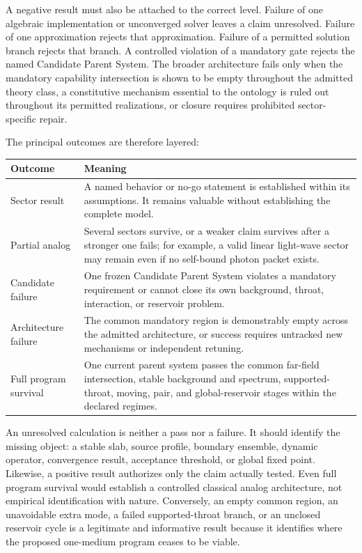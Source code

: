 A negative result must also be attached to the correct level. Failure of one
algebraic implementation or unconverged solver leaves a claim unresolved. Failure
of one approximation rejects that approximation. Failure of a permitted
solution branch rejects that branch. A controlled violation of a mandatory gate
rejects the named Candidate Parent System. The broader architecture fails only
when the mandatory capability intersection is shown to be empty throughout the
admitted theory class, a constitutive mechanism essential to the ontology is
ruled out throughout its permitted realizations, or closure requires prohibited
sector-specific repair.

The principal outcomes are therefore layered:

\begin{center}
\begin{tabularx}{\textwidth}{@{}L{0.27\textwidth}X@{}}
\toprule
\textbf{Outcome} & \textbf{Meaning} \\
\midrule
Sector result
& A named behavior or no-go statement is established within its assumptions. It
  remains valuable without establishing the complete model. \\
Partial analog
& Several sectors survive, or a weaker claim survives after a stronger one
  fails; for example, a valid linear light-wave sector may remain even if no
  self-bound photon packet exists. \\
Candidate failure
& One frozen Candidate Parent System violates a mandatory requirement or cannot
  close its own background, throat, interaction, or reservoir problem. \\
Architecture failure
& The common mandatory region is demonstrably empty across the admitted
  architecture, or success requires untracked new mechanisms or independent
  retuning. \\
Full program survival
& One current parent system passes the common far-field intersection, stable
  background and spectrum, supported-throat, moving, pair, and global-reservoir
  stages within the declared regimes. \\
\bottomrule
\end{tabularx}
\end{center}

An unresolved calculation is neither a pass nor a failure. It should identify
the missing object: a stable slab, source profile, boundary ensemble, dynamic
operator, convergence result, acceptance threshold, or global fixed point.
Likewise, a positive result authorizes only the claim actually tested. Even full
program survival would establish a controlled classical analog architecture,
not empirical identification with nature. Conversely, an empty common region,
an unavoidable extra mode, a failed supported-throat branch, or an unclosed
reservoir cycle is a legitimate and informative result because it identifies
where the proposed one-medium program ceases to be viable.
